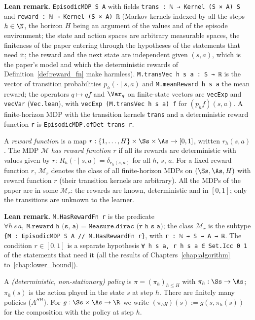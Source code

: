 \textbf{Lean remark.} \texttt{EpisodicMDP S A} with fields
\texttt{trans : ℕ → Kernel (S × A) S} and \texttt{reward : ℕ → Kernel (S × A) ℝ}
(Markov kernels indexed by all the steps $h \in \N$, the horizon $H$ being an argument of the
values and of the episode environment; the state and action spaces are arbitrary measurable
spaces, the finiteness of the paper entering through the hypotheses of the statements that
need it; the reward and the next state are independent given $(s, a)$, which is the
paper's model and which the deterministic rewards of Definition~\ref{def:reward_fn} make
harmless). \texttt{M.transVec h s a : S → ℝ} is the vector of transition probabilities
$p_h(\cdot \mid s, a)$ and \texttt{M.meanReward h s a} the mean reward; the operators
$q \mapsto qf$ and $\Var_q$ on finite-state vectors are \texttt{vecExp} and \texttt{vecVar}
(\texttt{Vec.lean}), with \texttt{vecExp (M.transVec h s a) f} for $(p_h f)(s, a)$. A
finite-horizon MDP with the transition kernels \texttt{trans} and a deterministic reward function
\texttt{r} is \texttt{EpisodicMDP.ofDet trans r}.

\begin{definition}\label{def:reward_fn}
\leanok
{}
A \emph{reward function} is a map $r : \{1, \dots, H\} \times \Ss \times \As \to [0, 1]$,
written $r_h(s, a)$. The MDP $\mathcal M$ \emph{has reward function $r$} if all its rewards are
deterministic with values given by $r$: $R_h(\cdot \mid s, a) = \delta_{r_h(s, a)}$ for all $h$,
$s$, $a$. For a fixed reward function $r$, $\mathcal M_r$ denotes the class of all finite-horizon
MDPs on $(\Ss, \As, H)$ with reward function $r$ (their transition kernels are arbitrary). All
the MDPs of the paper are in some $\mathcal M_r$: the rewards are known, deterministic and in
$[0, 1]$; only the transitions are unknown to the learner.
\end{definition}

\textbf{Lean remark.} \texttt{M.HasRewardFn r} is the predicate
$\forall h\, s\, a,\ \texttt{M.reward h (s, a) = Measure.dirac (r h s a)}$; the class
$\mathcal M_r$ is the subtype \texttt{\{M : EpisodicMDP S A // M.HasRewardFn r\}}, with
\texttt{r : ℕ → S → A → ℝ}. The
condition $r \in [0, 1]$ is a separate hypothesis \texttt{∀ h s a, r h s a ∈ Set.Icc 0 1} of
the statements that need it (all the results of Chapters~\ref{chap:algorithm}
to~\ref{chap:lower_bound}).

\begin{definition}\label{def:policy}
\leanok
{}
A \emph{(deterministic, non-stationary) policy} is $\pi = (\pi_h)_{h \le H}$ with
$\pi_h : \Ss \to \As$; $\pi_h(s)$ is the action played in the state $s$ at step $h$. There are
finitely many policies ($A^{SH}$). For $g : \Ss \times \As \to \R$ we write
$(\pi_h g)(s) := g(s, \pi_h(s))$ for the composition with the policy at step $h$.
\end{definition}

